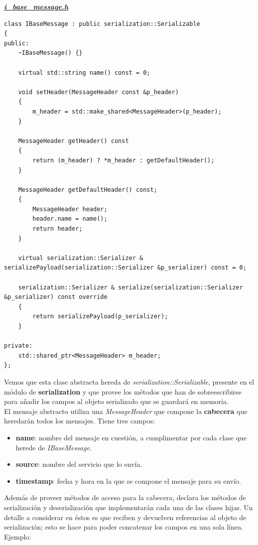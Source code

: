 \textbf{\textit{\href{https://github.com/adrianmorente/lazarillo-embedded/blob/master/messages-definition/inc/messages-definition/i_base_message.h}{i\_base\_message.h}}}
\begin{lstlisting}
class IBaseMessage : public serialization::Serializable
{
public:
	~IBaseMessage() {}

	virtual std::string name() const = 0;

	void setHeader(MessageHeader const &p_header)
	{
		m_header = std::make_shared<MessageHeader>(p_header);
	}

	MessageHeader getHeader() const
	{
		return (m_header) ? *m_header : getDefaultHeader();
	}

	MessageHeader getDefaultHeader() const;
	{
		MessageHeader header;
		header.name = name();
		return header;
	}

	virtual serialization::Serializer & serializePayload(serialization::Serializer &p_serializer) const = 0;

	serialization::Serializer & serialize(serialization::Serializer &p_serializer) const override
	{
		return serializePayload(p_serializer);
	}
	
private:
	std::shared_ptr<MessageHeader> m_header;
};
\end{lstlisting}

Vemos que esta clase abstracta hereda de \emph{serialization::Serializable}, presente en el módulo de \textbf{serialization} y que provee los métodos que han de sobreescribirse para añadir los campos al objeto serializado que se guardará en memoria.\\

El mensaje abstracto utiliza una \textit{MessageHeader} que compone la \textbf{cabecera} que heredarán todos los mensajes. Tiene tres campos:

\begin{itemize}
	\item \textbf{name}: nombre del mensaje en cuestión, a cumplimentar por cada clase que herede de \textit{IBaseMessage}.
	\item \textbf{source}: nombre del servicio que lo envía.
	\item \textbf{timestamp}: fecha y hora en la que se compone el mensaje para su envío.
\end{itemize}

Además de proveer métodos de acceso para la cabecera, declara los métodos de serialización y deserialización que implementarán cada una de las clases hijas. Un detalle a considerar en éstos es que reciben y devuelven referencias al objeto de serialización; esto se hace para poder concatenar los campos en una sola línea. Ejemplo:

